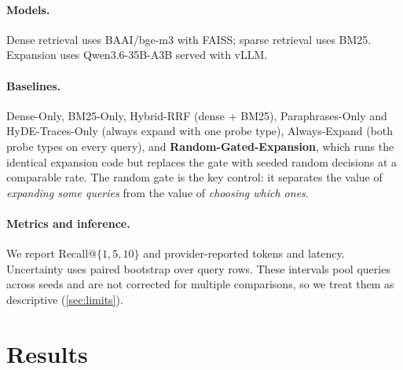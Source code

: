 \documentclass{article}
\newcommand{\tbl}[1]{}
\newcommand{\sqe}{\textsc{SQE}}
\begin{document}
\paragraph{Models.} Dense retrieval uses BAAI/bge-m3 with FAISS; sparse
retrieval uses BM25. Expansion uses Qwen3.6-35B-A3B served with vLLM.

\paragraph{Baselines.} Dense-Only, BM25-Only, Hybrid-RRF (dense + BM25),
Paraphrases-Only and HyDE-Traces-Only (always expand with one probe type),
Always-Expand (both probe types on every query), and
\textbf{Random-Gated-Expansion}, which runs the identical expansion code but
replaces the gate with seeded random decisions at a comparable rate. The random
gate is the key control: it separates the value of \emph{expanding some
queries} from the value of \emph{choosing which ones}.

\paragraph{Metrics and inference.} We report Recall@$\{1,5,10\}$ and
provider-reported tokens and latency. Uncertainty uses paired bootstrap over
query rows. These intervals pool queries across seeds and are not corrected for
multiple comparisons, so we treat them as descriptive (\cref{sec:limits}).

\section{Results}
\label{sec:results}

\begin{table}[t]
  \caption{Retrieval over 8 resampled memory stores (mean $\pm$ std over
  seeds, \%). \sqe{} expands 48.2\% of queries on average; the random gate
  expands 45.9\%.}
  \label{tab:multiseed}
  \centering
  \small
  \resizebox{\columnwidth}{!}{\tbl{multiseed_summary}}
\end{table}

\begin{table}[t]
  \caption{Paired bootstrap of \sqe{} minus each baseline, Recall@5 points,
  pooled over 4,000 query rows. $p=0.000$ denotes $p<0.001$.}
  \label{tab:paired}
  \centering
  \small
  \resizebox{\columnwidth}{!}{\tbl{multiseed_paired_tests}}
\end{table}
\end{document}
